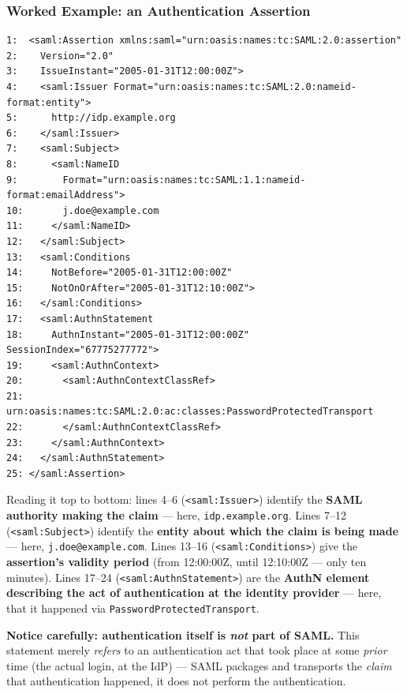 \documentclass[12pt, a4paper]{article}
\begin{document}
\subsubsection{Worked Example: an Authentication Assertion}
\begin{verbatim}
1:  <saml:Assertion xmlns:saml="urn:oasis:names:tc:SAML:2.0:assertion"
2:    Version="2.0"
3:    IssueInstant="2005-01-31T12:00:00Z">
4:    <saml:Issuer Format="urn:oasis:names:tc:SAML:2.0:nameid-format:entity">
5:      http://idp.example.org
6:    </saml:Issuer>
7:    <saml:Subject>
8:      <saml:NameID
9:        Format="urn:oasis:names:tc:SAML:1.1:nameid-format:emailAddress">
10:       j.doe@example.com
11:     </saml:NameID>
12:   </saml:Subject>
13:   <saml:Conditions
14:     NotBefore="2005-01-31T12:00:00Z"
15:     NotOnOrAfter="2005-01-31T12:10:00Z">
16:   </saml:Conditions>
17:   <saml:AuthnStatement
18:     AuthnInstant="2005-01-31T12:00:00Z" SessionIndex="67775277772">
19:     <saml:AuthnContext>
20:       <saml:AuthnContextClassRef>
21:         urn:oasis:names:tc:SAML:2.0:ac:classes:PasswordProtectedTransport
22:       </saml:AuthnContextClassRef>
23:     </saml:AuthnContext>
24:   </saml:AuthnStatement>
25: </saml:Assertion>
\end{verbatim}
Reading it top to bottom: lines 4--6 (\texttt{<saml:Issuer>}) identify the \textbf{SAML authority making the claim} --- here, \texttt{idp.example.org}. Lines 7--12 (\texttt{<saml:Subject>}) identify the \textbf{entity about which the claim is being made} --- here, \texttt{j.doe@example.com}. Lines 13--16 (\texttt{<saml:Conditions>}) give the \textbf{assertion's validity period} (from 12:00:00Z, until 12:10:00Z --- only ten minutes). Lines 17--24 (\texttt{<saml:AuthnStatement>}) are the \textbf{AuthN element describing the act of authentication at the identity provider} --- here, that it happened via \texttt{PasswordProtectedTransport}.

\textcolor{red!70!black}{\textbf{Notice carefully: authentication itself is \emph{not} part of SAML.}} This statement merely \emph{refers} to an authentication act that took place at some \emph{prior} time (the actual login, at the IdP) --- SAML packages and transports the \emph{claim} that authentication happened, it does not perform the authentication.
\end{document}
